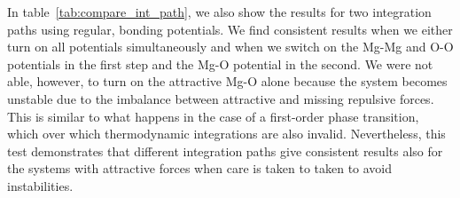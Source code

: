In table~\ref{tab:compare_int_path}, we also show the results for two
integration paths using regular, bonding potentials. We find consistent
results when we either turn on all potentials simultaneously and when we
switch on the Mg-Mg and O-O potentials in the first step and the Mg-O
potential in the second. We were not able, however, to turn on the
attractive Mg-O alone because the system becomes unstable due to the
imbalance between attractive and missing repulsive forces. This is similar
to what happens in the case of a first-order phase transition, which over
which thermodynamic integrations are also invalid. Nevertheless, this test
demonstrates that different integration paths give consistent results also
for the systems with attractive forces when care is taken to taken to avoid
instabilities.
